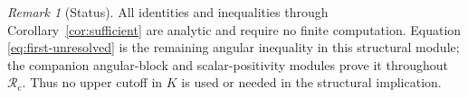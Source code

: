 \documentclass[11pt]{article}
\theoremstyle{remark}
\newtheorem{remark}[lemma]{Remark}
\begin{document}
\begin{remark}[Status]
All identities and inequalities through Corollary~\ref{cor:sufficient}
are analytic and require no finite computation.  Equation
\eqref{eq:first-unresolved} is the remaining angular inequality in this
structural module; the companion angular-block and scalar-positivity modules
prove it throughout $\mathcal R_{\mathrm c}$.  Thus no upper cutoff in $K$
is used or needed in the structural implication.
\end{remark}
\end{document}
